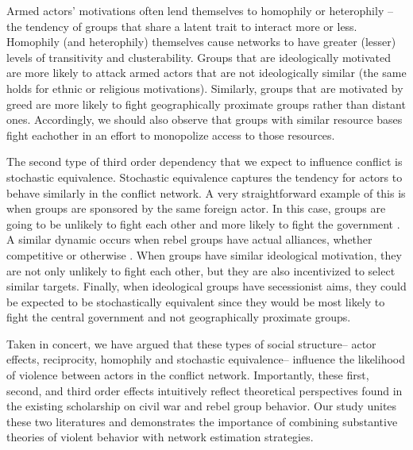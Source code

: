 Armed actors' motivations often lend themselves to homophily or heterophily -- the tendency of groups that share a latent trait to interact more or less. Homophily (and heterophily) themselves cause networks to have greater (lesser) levels of transitivity and clusterability. Groups that are ideologically motivated are more likely to attack armed actors that are not ideologically similar (the same holds for ethnic or religious motivations). Similarly, groups that are motivated by greed are more likely to fight geographically proximate groups rather than distant ones. Accordingly, we should also observe that groups with similar resource bases fight eachother in an effort to monopolize access to those resources.

The second type of third order dependency that we expect to influence conflict is stochastic equivalence. Stochastic equivalence captures the tendency for actors to behave similarly in the conflict network. A very straightforward example of this is when groups are sponsored by the same foreign actor. In this case, groups are going to be unlikely to fight each other and more likely to fight the government \citep{bapat:bond:2012}. A similar dynamic occurs when rebel groups have actual alliances, whether competitive or otherwise \citep{zeigler:2015}. When groups have similar ideological motivation, they are not only unlikely to fight each other, but they are also incentivized to select similar targets. Finally, when ideological groups have secessionist aims, they could be expected to be stochastically equivalent since they would be most likely to fight the central government and not geographically proximate groups.

Taken in concert, we have argued that these types of social structure-- actor effects, reciprocity, homophily and stochastic equivalence-- influence the likelihood of violence between actors in the conflict network. Importantly, these first, second, and third order effects intuitively reflect theoretical perspectives found in the existing scholarship on civil war and rebel group behavior.  Our study unites these two literatures and demonstrates the importance of combining substantive theories of violent behavior with network estimation strategies. %

